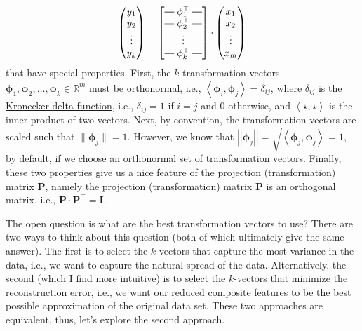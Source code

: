 \documentclass{article}[11pt]
\makeatletter
\newcommand{\brows}[1]{%
  \begin{bmatrix}
  \begin{array}{@{\protect\rotvert\;}c@{\;\protect\rotvert}}
  #1
  \end{array}
  \end{bmatrix}
}
\newcommand{\rotvert}{\rotatebox[origin=c]{90}{$\vert$}}
\newcommand{\rowsvdots}{\multicolumn{1}{@{}c@{}}{\vdots}}
\def\R{\mathbb{R}}
\newcommand{\norm}[1]{\left|\left|#1\right|\right|}
\makeatother
\begin{document}
\begin{equation}
   \begin{pmatrix}
      y_{1} \\
      y_{2} \\
      \vdots \\
      y_{k}
   \end{pmatrix} = \brows{{\mathbf{\phi}}_1^\top \\ {\mathbf{\phi}}_2^\top \\ \rowsvdots \\ {\mathbf{\phi}}_k^\top}
   \cdot
   \begin{pmatrix}
      x_{1} \\
      x_{2} \\
      \vdots \\
      x_{m}
   \end{pmatrix}
\end{equation}
that have special properties. First, the $k$ transformation vectors ${\mathbf{\phi}}_{1},{\mathbf{\phi}}_{2},\dots,{\mathbf{\phi}}_{k}\in\R^{m}$ must be orthonormal, i.e., $\left<{\mathbf{\phi}}_{i},{\mathbf{\phi}}_{j}\right> = \delta_{ij}$, 
where $\delta_{ij}$ is the \href{https://en.wikipedia.org/wiki/Kronecker_delta}{Kronecker delta function}, i.e., $\delta_{ij} = 1$ if $i=j$ and $0$ otherwise, and
$\left<\star,\star\right>$ is the inner product of two vectors.
Next, by convention, the transformation vectors are scaled such that $\|{\mathbf{\phi}}_{j}\|=1$.
However, we know that $\norm{\mathbf{\phi}_{j}} = \sqrt{\left<\mathbf{\phi}_{j},\mathbf{\phi}_{j}\right>} = 1$, 
by default, if we choose an orthonormal set of transformation vectors. Finally, these two properties give us a nice feature of the projection (transformation) matrix $\mathbf{P}$, 
namely the projection (transformation) matrix $\mathbf{P}$ is an orthogonal matrix, i.e., $\mathbf{P}\cdot\mathbf{P}^{\top} = \mathbf{I}$. 

The open question is what are the best transformation vectors to use? 
There are two ways to think about this question (both of which ultimately give the same answer). The first is to select the $k$-vectors that capture the most variance in the data, i.e., we want to capture the natural spread of the data.
Alternatively, the second (which I find more intuitive) is to select the $k$-vectors that minimize the reconstruction error, 
i.e., we want our reduced composite features to be the best possible approximation of the original data set.
These two approaches are equivalent, thus, let's explore the second approach.
\end{document}
